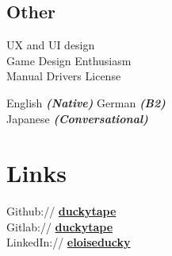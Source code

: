 \documentclass[a4paper]{deedy-resume_twopage} %
\begin{document}
\begin{minipage}[t]{0.25\textwidth}
  \sectionspace

  \subsection{Other}
  \textbullet{} UX and UI design \\
  \textbullet{} Game Design \textbullet{} Enthusiasm\\
  \textbullet{} Manual Drivers License\\

  \sectionspace

  \textbullet{} English {\footnotesize \textit{\textbf{(Native)}}} \textbullet{} German {\footnotesize \textit{\textbf{(B2)}}} \\
  \textbullet{} Japanese {\footnotesize \textit{\textbf{(Conversational)}}} \\


  \sectionspace %

  \sectionspace
  \section{Links}

  Github:// \href{https://github.com/duckytape}{\bf duckytape} \\
  Gitlab:// \href{https://gitlab.com/duckytape} {\bf duckytape} \\
  LinkedIn:// \href{https://www.linkedin.com/in/eloiseducky}{\bf eloiseducky} \\

  \sectionspace %



\end{minipage} %
\end{document}
